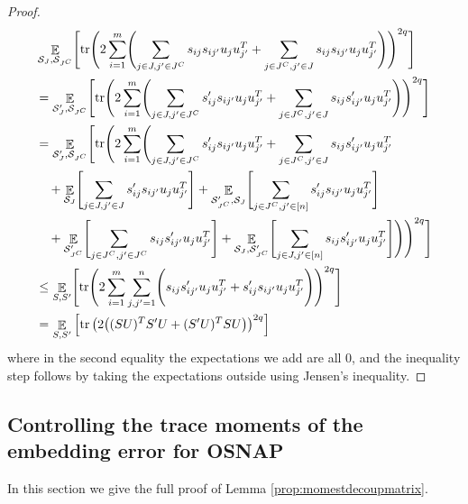 \documentclass[11pt]{amsart}
\numberwithin{equation}{section}
\numberwithin{equation}{section}
\DeclareMathOperator{\E}{\mathbb{E}}
\DeclareMathOperator*{\tr}{tr}
\DeclarePairedDelimiter{\paren}{(}{)}
\theoremstyle{remark}
\theoremstyle{definition}
\begin{document}
\begin{proof}
\begin{align*}
    &\E_{\mathcal{S}_J, \mathcal{S}_{J^C} } \Biggl[ \tr \Biggl(   2 \sum_{i=1}^m \Biggl( \sum_{j\in J, j' \in J^C}   s_{ij}s_{ij'} u_ju_{j'}^T + \sum_{j\in J^C, j' \in J}   s_{ij}s_{ij'} u_ju_{j'}^T \Biggr) \Biggr)^{2q} \Biggr] \\
    &= \E_{\mathcal{S}'_J, \mathcal{S}_{J^C}} \Biggl[ \tr \Biggl(   2 \sum_{i=1}^m \Biggl( \sum_{j\in J, j' \in J^C}   s'_{ij}s_{ij'} u_ju_{j'}^T + \sum_{j\in J^C, j' \in J}   s_{ij}s'_{ij'} u_ju_{j'}^T \Biggr) \Biggr)^{2q} \Biggr] \\
    &= \E_{\mathcal{S}'_J, \mathcal{S}_{J^C}} \Biggl[ \tr \Biggl(   2 \sum_{i=1}^m \Biggl( \sum_{j\in J, j' \in J^C}   s'_{ij}s_{ij'} u_ju_{j'}^T + \sum_{j\in J^C, j' \in J}   s_{ij}s'_{ij'} u_ju_{j'}^T  \\
    &\quad + \E_{\mathcal{S}_{J}} \Biggl[ \sum_{j\in J, j' \in J}   s'_{ij}s_{ij'} u_ju_{j'}^T \Biggr] + \E_{\mathcal{S}'_{J^C}, \mathcal{S}_{J}} \Biggl[ \sum_{j\in J^C, j' \in [n]}   s'_{ij}s_{ij'} u_ju_{j'}^T \Biggr] \\
    &\quad + \E_{\mathcal{S}'_{J^C}} \Biggl[ \sum_{j\in J^C, j' \in J^C}   s_{ij}s'_{ij'} u_ju_{j'}^T \Biggr] + \E_{\mathcal{S}_J, \mathcal{S}'_{J^C}} \Biggl[ \sum_{j\in J, j' \in [n]}   s_{ij}s'_{ij'} u_ju_{j'}^T \Biggr] \Biggr) \Biggr)^{2q} \Biggr] \\
    &\le \E_{S,S'} \Biggl[ \tr \Biggl( 2 \sum_{i=1}^m  \sum_{j,j'=1}^n \Biggl( s_{ij}s'_{ij'} u_ju_{j'}^T + s'_{ij}s_{ij'} u_ju_{j'}^T \Biggr) \Biggr)^{2q} \Biggr] \\
    &= \E_{S,S'} \left[ \tr \left( 2\paren*{(SU)^TS'U + (S'U)^TSU} \right)^{2q} \right]
\end{align*}
where in the second equality the expectations we add are all $0$, and the inequality step follows by taking the expectations outside using Jensen's inequality. 
\end{proof}

\subsection{Controlling the trace moments of the embedding error for OSNAP} \label{subsec:osnaptracemom}
In this section we give the full proof of Lemma \ref{prop:momestdecoupmatrix}.
\end{document}
